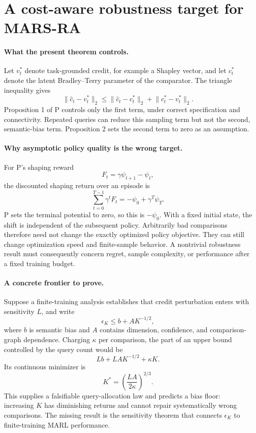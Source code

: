 \section*{A cost-aware robustness target for MARS-RA}

\paragraph{What the present theorem controls.}
Let \(v_t^*\) denote task-grounded credit, for example a Shapley vector, and
let \(c_t^*\) denote the latent Bradley--Terry parameter of the comparator.
The triangle inequality gives
\[
 \lVert \widehat c_t-v_t^*\rVert_2
 \leq
 \lVert \widehat c_t-c_t^*\rVert_2
 +\lVert c_t^*-v_t^*\rVert_2.
\]
Proposition 1 of P controls only the first term, under correct specification
and connectivity.  Repeated queries can reduce this sampling term but not the
second, semantic-bias term.  Proposition 2 sets the second term to zero as an
assumption.

\paragraph{Why asymptotic policy quality is the wrong target.}
For P's shaping reward
\[
 F_t=\gamma\psi_{t+1}-\psi_t,
\]
the discounted shaping return over an episode is
\[
 \sum_{t=0}^{T-1}\gamma^tF_t
 =-\psi_0+\gamma^T\psi_T.
\]
P sets the terminal potential to zero, so this is \(-\psi_0\).  With a fixed
initial state, the shift is independent of the subsequent policy.  Arbitrarily
bad comparisons therefore need not change the exactly optimized policy
objective.  They can still change optimization speed and finite-sample
behavior.  A nontrivial robustness result must consequently concern regret,
sample complexity, or performance after a fixed training budget.

\paragraph{A concrete frontier to prove.}
Suppose a finite-training analysis establishes that credit perturbation enters
with sensitivity \(L\), and write
\[
 \epsilon_K\leq b+A K^{-1/2},
\]
where \(b\) is semantic bias and \(A\) contains dimension, confidence, and
comparison-graph dependence.  Charging \(\kappa\) per comparison, the part of
an upper bound controlled by the query count would be
\[
 Lb+LAK^{-1/2}+\kappa K.
\]
Its continuous minimizer is
\[
 K^*=\left(\frac{LA}{2\kappa}\right)^{2/3}.
\]
This supplies a falsifiable query-allocation law and predicts a bias floor:
increasing \(K\) has diminishing returns and cannot repair systematically
wrong comparisons.  The missing result is the sensitivity theorem that
connects \(\epsilon_K\) to finite-training MARL performance.

